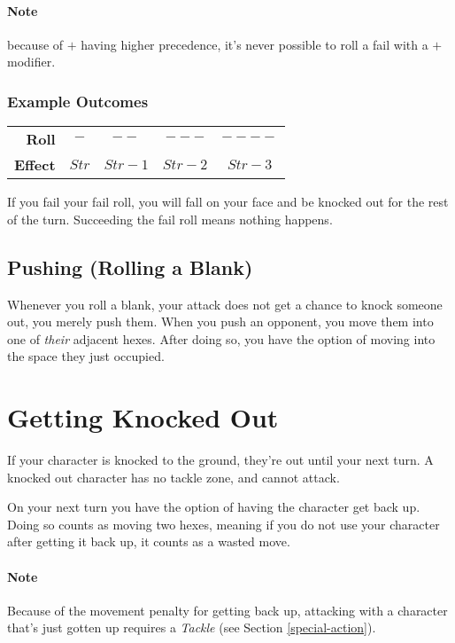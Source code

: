 \paragraph{Note} because of $+$ having higher precedence, it’s never possible to roll a fail with a $+$ modifier.
\subsubsection{Example Outcomes}
\begin{tabular}{r|c|c|c|c}
    \textbf{Roll} & $-$ & $--$ & $---$ & $----$ \\
    \textbf{Effect} & $Str$ & $Str-1$ & $Str-2$ & $Str-3$
\end{tabular}

If you fail your fail roll, you will fall on your face and be knocked out for the rest of the turn. 
Succeeding the fail roll means nothing happens.

\subsection{Pushing (Rolling a Blank)}
Whenever you roll a blank, your attack does not get a chance to knock someone out, you merely push them. When you push an opponent, you move them into one of \textit{their} adjacent hexes. After doing so, you have the option of moving into the space they just occupied.

\section{Getting Knocked Out}
If your character is knocked to the ground, they're out until your next turn. A knocked out character has no tackle zone, and cannot attack.

On your next turn you have the option of having the character get back up. Doing so counts as moving two hexes, meaning if you do not use your character after getting it back up, it counts as a wasted move. 

\paragraph{Note} Because of the movement penalty for getting back up, attacking with a character that's just gotten up requires a \textit{Tackle} (see Section \ref{special-action}).